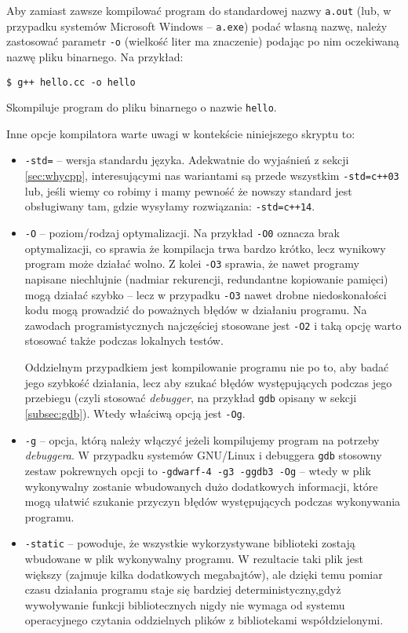 Aby zamiast zawsze kompilować program do standardowej nazwy \texttt{a.out} (lub,
w przypadku systemów Microsoft Windows -- \texttt{a.exe}) podać własną nazwę,
należy zastosować parametr \texttt{-o} (wielkość liter ma znaczenie) podając
po nim oczekiwaną nazwę pliku binarnego. Na przykład:
\begin{Verbatim}[fontsize=\footnotesize]
$ g++ hello.cc -o hello
\end{Verbatim}

Skompiluje program do pliku binarnego o nazwie \texttt{hello}.

Inne opcje kompilatora warte uwagi w kontekście niniejszego skryptu to:
\begin{itemize}
\item \texttt{-std=} -- wersja standardu języka. Adekwatnie do wyjaśnień
z sekcji \ref{sec:whycpp}, interesującymi nas wariantami są przede wszystkim
\texttt{-std=c++03} lub, jeśli wiemy co robimy i mamy pewność że nowszy standard
jest obsługiwany tam, gdzie wysyłamy rozwiązania: \texttt{-std=c++14}.

\item \texttt{-O} -- poziom/rodzaj optymalizacji. Na przykład \texttt{-O0}
oznacza brak optymalizacji, co sprawia że kompilacja trwa bardzo krótko,
lecz wynikowy program może działać wolno. Z kolei \texttt{-O3} sprawia, że nawet
programy napisane niechlujnie (nadmiar rekurencji, redundantne kopiowanie
pamięci) mogą działać szybko -- lecz w przypadku \texttt{-O3} nawet drobne
niedoskonałości kodu mogą prowadzić do poważnych błędów w działaniu programu.
Na zawodach programistycznych najczęściej stosowane jest \texttt{-O2} i taką
opcję warto stosować także podczas lokalnych testów.

Oddzielnym przypadkiem jest kompilowanie programu nie po to, aby badać jego
szybkość działania, lecz aby szukać błędów występujących podczas jego przebiegu
(czyli stosować \emph{debugger}, na przykład \texttt{gdb} opisany w sekcji
\ref{subsec:gdb}). Wtedy właściwą opcją jest \texttt{-Og}.

\item \texttt{-g} -- opcja, którą należy włączyć jeżeli kompilujemy program na
potrzeby \emph{debuggera}. W przypadku systemów GNU/Linux i debuggera
\texttt{gdb} stosowny zestaw pokrewnych opcji to
\texttt{-gdwarf-4 -g3 -ggdb3 -Og} -- wtedy w plik wykonywalny zostanie
wbudowanych dużo dodatkowych informacji, które mogą ułatwić szukanie przyczyn
błędów występujących podczas wykonywania programu.

\item \texttt{-static} -- powoduje, że wszystkie wykorzystywane biblioteki
zostają wbudowane w plik wykonywalny programu. W rezultacie taki plik jest
większy (zajmuje kilka dodatkowych megabajtów), ale dzięki temu pomiar czasu
działania programu staje się bardziej deterministyczny,gdyż wywoływanie funkcji
bibliotecznych nigdy nie wymaga od systemu operacyjnego czytania oddzielnych
plików z bibliotekami współdzielonymi.


\end{itemize}
